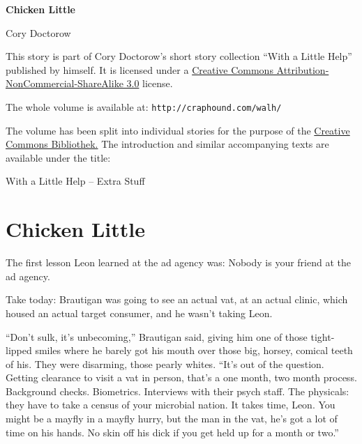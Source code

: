 


\raggedbottom

\begin{center}
\textbf{\huge\textsf{Chicken Little}}

\medskip
Cory Doctorow

\end{center}

\bigskip

\begin{flushleft}
This story is part of Cory Doctorow’s short story collection
“With a Little Help” published by himself. It is licensed under a
\href{http://creativecommons.org/licenses/by-nc-sa/}
{Creative Commons Attribution-NonCommercial-ShareAlike 3.0} license.

\bigskip

The whole volume is available at:
\texttt{http://craphound.com/walh/}

\medskip

The volume has been split into individual stories for the purpose of the
\href{http://ccbib.org}{Creative Commons Bibliothek.}
The introduction and similar accompanying texts are available under the 
title:
\end{flushleft}
\begin{center}
With a Little Help -- Extra Stuff
\end{center}

\newpage

\section{Chicken Little}

The first lesson Leon learned at the ad agency was: Nobody is your 
friend at the ad agency.

Take today: Brautigan was going to see an actual vat, at an actual 
clinic, which housed an actual target consumer, and he wasn't taking 
Leon.

“Don't sulk, it's unbecoming,” Brautigan said, giving him one of 
those tight-lipped smiles where he barely got his mouth over those big, 
horsey, comical teeth of his. They were disarming, those pearly whites. 
“It's out of the question. Getting clearance to visit a vat in 
person, that's a one month, two month process. Background checks. 
Biometrics. Interviews with their psych staff. The physicals: they have 
to take a census of your microbial nation. It takes time, Leon. You 
might be a mayfly in a mayfly hurry, but the man in the vat, he's got a 
lot of time on his hands. No skin off his dick if you get held up for a 
month or two.”

